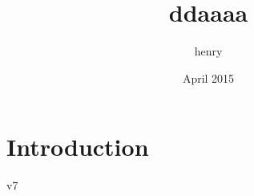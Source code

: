\documentclass{article}
\title{ddaaaa}
\author{henry }
\date{April 2015}
\begin{document}
\maketitle


\section{Introduction}
v7
\end{document}
